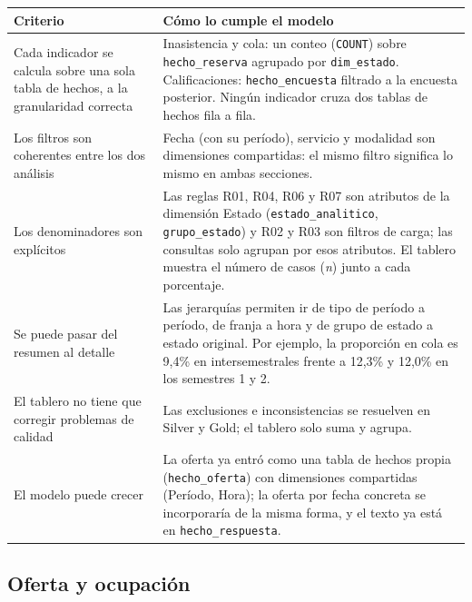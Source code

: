 \documentclass[11pt,letterpaper]{article}
\begin{document}
\begingroup\small\setlength{\tabcolsep}{4pt}\renewcommand{\arraystretch}{1.15}
\begin{longtable}{>{\raggedright\arraybackslash}p{}>{\raggedright\arraybackslash}p{}}
\toprule
\textbf{Criterio} & \textbf{Cómo lo cumple el modelo} \\
\midrule
\endhead
Cada indicador se calcula sobre una sola tabla de hechos, a la granularidad correcta & Inasistencia y cola: un conteo (\texttt{COUNT}) sobre \texttt{hecho\_\allowbreak{}reserva} agrupado por \texttt{dim\_\allowbreak{}estado}. Calificaciones: \texttt{hecho\_\allowbreak{}encuesta} filtrado a la encuesta posterior. Ningún indicador cruza dos tablas de hechos fila a fila. \\
Los filtros son coherentes entre los dos análisis & Fecha (con su período), servicio y modalidad son dimensiones compartidas: el mismo filtro significa lo mismo en ambas secciones. \\
Los denominadores son explícitos & Las reglas R01, R04, R06 y R07 son atributos de la dimensión Estado (\texttt{estado\_\allowbreak{}analitico}, \texttt{grupo\_\allowbreak{}estado}) y R02 y R03 son filtros de carga; las consultas solo agrupan por esos atributos. El tablero muestra el número de casos (\emph{n}) junto a cada porcentaje. \\
Se puede pasar del resumen al detalle & Las jerarquías permiten ir de tipo de período a período, de franja a hora y de grupo de estado a estado original. Por ejemplo, la proporción en cola es 9,4\% en intersemestrales frente a 12,3\% y 12,0\% en los semestres 1 y 2. \\
El tablero no tiene que corregir problemas de calidad & Las exclusiones e inconsistencias se resuelven en Silver y Gold; el tablero solo suma y agrupa. \\
El modelo puede crecer & La oferta ya entró como una tabla de hechos propia (\texttt{hecho\_\allowbreak{}oferta}) con dimensiones compartidas (Período, Hora); la oferta por fecha concreta se incorporaría de la misma forma, y el texto ya está en \texttt{hecho\_\allowbreak{}respuesta}. \\
\bottomrule
\end{longtable}
\endgroup


\subsection{Oferta y ocupación}
\end{document}
